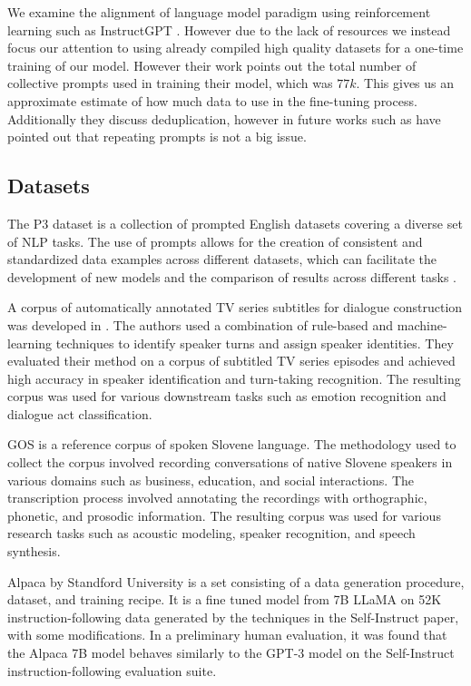 \documentclass[fleqn,moreauthors,10pt]{ds_report}
\begin{document}
We examine the alignment of language model paradigm using reinforcement learning such as InstructGPT \cite{ouyang2022training}. However due to the lack of resources we instead focus our attention to using already compiled high quality datasets for a one-time training of our model. However their work points out the total number of collective prompts used in training their model, which was $77k$. This gives us an approximate estimate of how much data to use in the fine-tuning process. Additionally they discuss deduplication, however in future works such as \cite{alpaca} have pointed out that repeating prompts is not a big issue.

\subsection*{Datasets}
The P3 dataset is a collection of prompted English datasets covering a diverse set of NLP tasks. The use of prompts allows for the creation of consistent and standardized data examples across different datasets, which can facilitate the development of new models and the comparison of results across different tasks \cite{bach2022promptsource}. 

A corpus of automatically annotated TV series subtitles for dialogue construction was developed in \cite{tv_series_subtitles}. The authors used a combination of rule-based and machine-learning techniques to identify speaker turns and assign speaker identities. They evaluated their method on a corpus of subtitled TV series episodes and achieved high accuracy in speaker identification and turn-taking recognition. The resulting corpus was used for various downstream tasks such as emotion recognition and dialogue act classification.

GOS \cite{Verdonik2013} is a reference corpus of spoken Slovene language. The methodology used to collect the corpus involved recording conversations of native Slovene speakers in various domains such as business, education, and social interactions. The transcription process involved annotating the recordings with orthographic, phonetic, and prosodic information. The resulting corpus was used for various research tasks such as acoustic modeling, speaker recognition, and speech synthesis. 

Alpaca \cite{alpaca} by Standford University is a set consisting of a data generation procedure, dataset, and training recipe. It is a fine tuned model from 7B LLaMA \cite{touvron2023llama} on 52K instruction-following data generated by the techniques in the Self-Instruct \cite{wang2022selfinstruct} paper, with some modifications. In a preliminary human evaluation, it was found that the Alpaca 7B model behaves similarly to the GPT-3 model on the Self-Instruct instruction-following evaluation suite.
\end{document}
